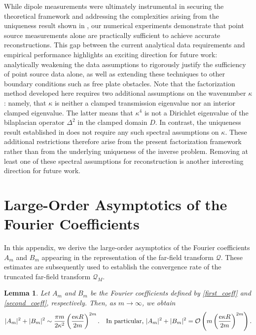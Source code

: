 \documentclass{article}
\newtheorem{Lemma}[Theorem]{Lemma}
\begin{document}
While dipole measurements were ultimately instrumental in securing the theoretical framework and addressing the complexities arising from the uniqueness result shown in \cite{BourgeoisRecoquillay2020}, our numerical experiments demonstrate that point source measurements alone are practically sufficient to achieve accurate reconstructions. This gap between the current analytical data requirements and empirical performance highlights an exciting direction for future work: analytically weakening the data assumptions to rigorously justify the sufficiency of point source data alone, as well as extending these techniques to other boundary conditions such as free plate obstacles. Note that the factorization method developed here requires two additional assumptions on the wavenumber $\kappa$: namely, that $\kappa$ is neither a clamped transmission eigenvalue nor an interior clamped eigenvalue. The latter means that $\kappa^4$ is not a Dirichlet eigenvalue of the bilaplacian operator $\Delta^2$ in the clamped domain $D$. In contrast, the uniqueness result established in \cite{BourgeoisRecoquillay2020} does not require any such spectral assumptions on $\kappa$. These additional restrictions therefore arise from the present factorization framework rather than from the underlying uniqueness of the inverse problem. Removing at least one of these spectral assumptions for reconstruction is another interesting direction for future work.

\appendix

\section{Large-Order Asymptotics of the Fourier Coefficients}
In this appendix, we derive the large-order asymptotics of the Fourier
coefficients $A_m$ and $B_m$ appearing in the representation of the
far-field transform $\mathcal{Q}$. These estimates are subsequently used to
establish the convergence rate of the truncated far-field transform
$\mathcal Q_M$.
\label{app:asymptotics}
\begin{Lemma}\label{lem:coeff_asymptotics}
Let $A_m$ and $B_m$ be the Fourier coefficients defined by \eqref{first_coeff} and
\eqref{second_coeff}, respectively. Then, as $m\to\infty$, we obtain
\[
|A_m|^2+|B_m|^2
\sim
\frac{\pi m}{2\kappa^2}
\left(\frac{\mathrm e\kappa R}{2m}\right)^{2m}. \quad \text{In particular,
$
|A_m|^2+|B_m|^2
=
\mathcal O\left(
m
\left(\frac{\mathrm e\kappa R}{2m}\right)^{2m}
\right).
$}
\]
\end{Lemma}
\end{document}
